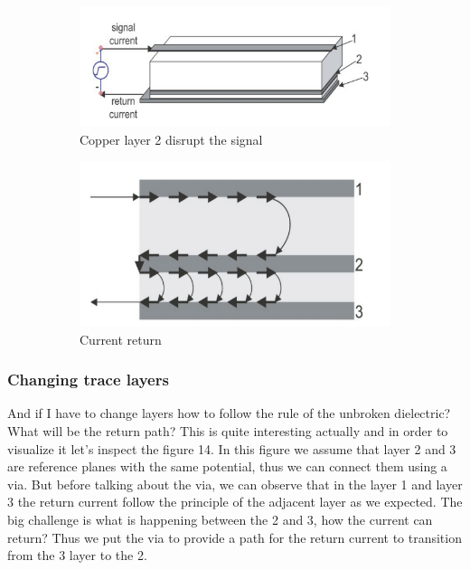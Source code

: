 \documentclass[final]{cubedoc}
\begin{document}
	\begin{figure}[h!]
		\centering
		\begin{subfigure}{.4\textwidth}
			\centering
			\includegraphics[keepaspectratio, height=0.2\textheight, width=\textwidth]{assets/broken_dielectric.png}
			\caption{Copper layer 2 disrupt the signal \cite{bogatin2009signal}}
		\end{subfigure}
		\begin{subfigure}{.4\textwidth}
			\centering
			\includegraphics[keepaspectratio, height=0.2\textheight, width=\textwidth]{assets/side_current.png}
			\caption{Current return \cite{bogatin2009signal}}
		\end{subfigure}
		\caption{}
	\end{figure}
	
	\subsubsection{Changing trace layers}
	
	And if I have to change layers how to follow the rule of the unbroken dielectric? What will be the return path? This is quite interesting actually and in order to visualize it let's inspect the figure 14.	In this figure we assume that layer 2 and 3 are reference planes with the same potential, thus we can connect them using a via. But before talking about the via, we can observe that in the layer 1 and layer 3 the return current follow the principle of the adjacent layer as we expected. The big challenge is what is happening between the 2 and 3, how the current can return? Thus we put the via to provide a path for the return current to transition from the 3 layer to the 2.
	
\end{document}
